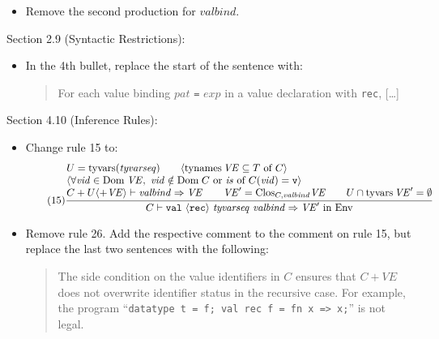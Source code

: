 \documentclass[twoside,titlepage]{article}
\begin{document}
\begin{appendix}
\begin{itemize}
\item Remove the second production for $\mathit{valbind}$.
\end{itemize}

Section 2.9 (Syntactic Restrictions):
\begin{itemize}
\item In the 4th bullet, replace the start of the sentence with:
  \begin{quote}
  For each value binding $\mathit{pat}$ {\tt=} $\mathit{exp}$ in a value declaration with {\tt rec}, [\dots]
  \end{quote}
\end{itemize}

Section 4.10 (Inference Rules):
\begin{itemize}
\item Change rule 15 to: 
  \begin{equation}
  \tag{15}
  \frac{
  \begin{array}{@{}l@{}}
  U = \mbox{tyvars}(\mathit{tyvarseq})
  \qquad
  \langle \mbox{tynames}\,\mathit{VE} \subseteq \mbox{$T$ of $C$} \rangle
  \\
  \langle \forall\mathit{vid} \in \mbox{Dom}\;\mathit{VE},~\mathit{vid} \notin \mbox{Dom}\;C~\mbox{or $\mathit{is}$ of $C(\mathit{vid}) = {\tt v}$}\rangle
  \\
  C+U\langle+\mathit{VE}\rangle \vdash \mathit{valbind} \Rightarrow \mathit{VE}
  \qquad
  \mathit{VE}' = \mbox{Clos}_{C,\mathit{valbind}}\mathit{VE}
  \qquad
  U \cap \mbox{tyvars}\,\mathit{VE}' = \emptyset
  \end{array}
  }{
  C \vdash {\tt{val}}~\langle{\tt{rec}}\rangle~\mathit{tyvarseq}~\mathit{valbind} \Rightarrow \mbox{$\mathit{VE}'$ in Env}
  }
  \end{equation}

\item Remove rule 26. Add the respective comment to the comment on rule 15, but replace the last two sentences with the following: 
  \begin{quote}
  The side condition on the value identifiers in $C$ ensures that $C + \mathit{VE}$ does not overwrite identifier status in the recursive case. For example, the program
  ``{\tt{datatype t = f; val rec f = fn x => x;}}'' is not legal.
  \end{quote}
\end{itemize}


\end{appendix}
\end{document}

